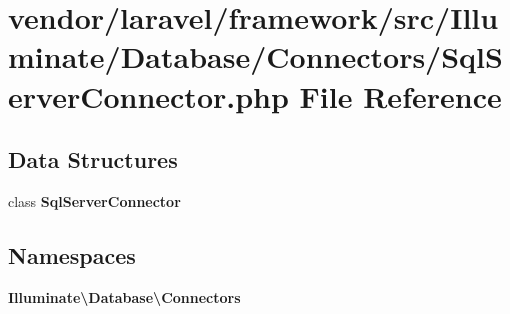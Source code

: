 \section{vendor/laravel/framework/src/\+Illuminate/\+Database/\+Connectors/\+Sql\+Server\+Connector.php File Reference}
\label{_sql_server_connector_8php}
\subsection*{Data Structures}
\begin{DoxyCompactItemize}
\item 
class {\bf Sql\+Server\+Connector}
\end{DoxyCompactItemize}
\subsection*{Namespaces}
\begin{DoxyCompactItemize}
\item 
 {\bf Illuminate\textbackslash{}\+Database\textbackslash{}\+Connectors}
\end{DoxyCompactItemize}
